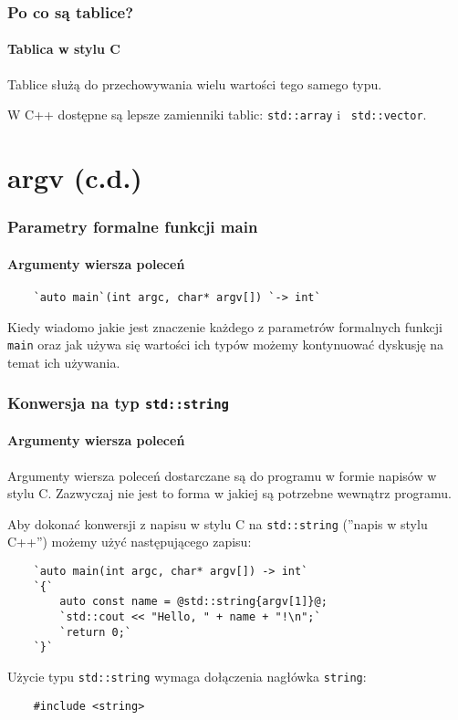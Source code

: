\documentclass[aspectratio=169]{beamer}
\begin{document}
\begin{frame}
    \frametitle{Po co są tablice?}
    \framesubtitle{Tablica w stylu C}

    Tablice służą do przechowywania wielu wartości tego samego typu.

    \vspace{1em}

    W C++ dostępne są lepsze zamienniki tablic: {\tt std::array} i {\tt
    std::vector}.
\end{frame}

\section{argv (c.d.)}

\begin{frame}[fragile]
    \frametitle{Parametry formalne funkcji main}
    \framesubtitle{Argumenty wiersza poleceń}

    \vspace{1em}
    \begin{lstlisting}
    `auto main`(int argc, char* argv[]) `-> int`
    \end{lstlisting}
    \vspace{1em}

    Kiedy wiadomo jakie jest znaczenie każdego z parametrów formalnych funkcji
    {\tt main} oraz jak używa się wartości ich typów możemy kontynuować dyskusję
    na temat ich używania.
\end{frame}

\begin{frame}[fragile]
    \frametitle{Konwersja na typ {\tt std::string}}
    \framesubtitle{Argumenty wiersza poleceń}

    Argumenty wiersza poleceń dostarczane są do programu w formie napisów w
    stylu C. Zazwyczaj nie jest to forma w jakiej są potrzebne wewnątrz
    programu.

    Aby dokonać konwersji z napisu w stylu C na {\tt std::string} (''napis w
    stylu C++'') możemy użyć następującego zapisu:

    \begin{lstlisting}
    `auto main(int argc, char* argv[]) -> int`
    `{`
        auto const name = @std::string{argv[1]}@;
        `std::cout << "Hello, " + name + "!\n";`
        `return 0;`
    `}`
    \end{lstlisting}

    Użycie typu {\tt std::string} wymaga dołączenia nagłówka {\tt string}:
    \begin{lstlisting}
    #include <string>
    \end{lstlisting}
\end{frame}
\end{document}
